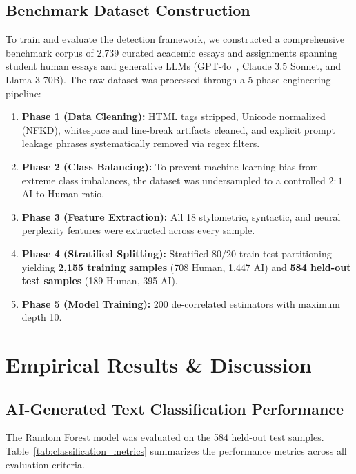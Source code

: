 \documentclass[journal]{IEEEtran}
\begin{document}
\subsection{Benchmark Dataset Construction}
To train and evaluate the detection framework, we constructed a comprehensive benchmark corpus of 2,739 curated academic essays and assignments spanning student human essays and generative LLMs (GPT-4o~\cite{achiam2023gpt4}, Claude 3.5 Sonnet, and Llama 3 70B). The raw dataset was processed through a 5-phase engineering pipeline:
\begin{enumerate}
    \item \textbf{Phase 1 (Data Cleaning):} HTML tags stripped, Unicode normalized (NFKD), whitespace and line-break artifacts cleaned, and explicit prompt leakage phrases systematically removed via regex filters.
    \item \textbf{Phase 2 (Class Balancing):} To prevent machine learning bias from extreme class imbalances, the dataset was undersampled to a controlled $2:1$ AI-to-Human ratio.
    \item \textbf{Phase 3 (Feature Extraction):} All 18 stylometric, syntactic, and neural perplexity features were extracted across every sample.
    \item \textbf{Phase 4 (Stratified Splitting):} Stratified $80/20$ train-test partitioning yielding \textbf{2,155 training samples} (708 Human, 1,447 AI) and \textbf{584 held-out test samples} (189 Human, 395 AI).
    \item \textbf{Phase 5 (Model Training):} 200 de-correlated estimators with maximum depth 10.
\end{enumerate}

\section{Empirical Results \& Discussion}

\subsection{AI-Generated Text Classification Performance}
The Random Forest model was evaluated on the 584 held-out test samples. Table~\ref{tab:classification_metrics} summarizes the performance metrics across all evaluation criteria.
\end{document}

